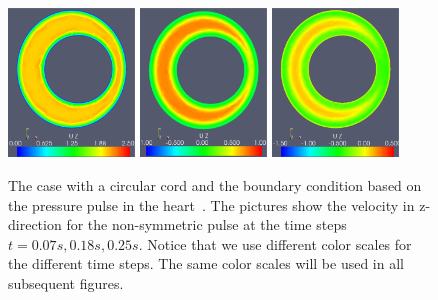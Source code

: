 \begin{figure}
\center
\includegraphics[width=0.3\textwidth]{chapters/hentschel/pdf/pulse_f1_08_sysmax_nmb7.pdf}
\includegraphics[width=0.3\textwidth]{chapters/hentschel/pdf/pulse_f1_08_sysdia_nmb18.pdf}
\includegraphics[width=0.3\textwidth]{chapters/hentschel/pdf/pulse_f1_08_diamin1_nmb25.pdf}
\caption{The case with a circular cord and the boundary condition based
on the pressure pulse in the heart~\citep{SmithChase2ShawEtAl2006}.
The pictures show the velocity in z-direction for the non-symmetric pulse
at the time steps $t=0.07s, 0.18s, 0.25s$. Notice that we use different
color scales for the different time steps. The same color scales will
be used in all subsequent figures.}
\label{fig:case1}
\end{figure}

